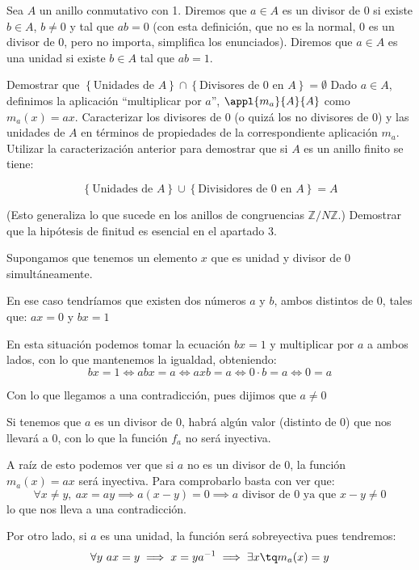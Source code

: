 \begin{problem}[10]
	Sea $A$ un anillo conmutativo con 1. Diremos que $a∈A$ es un divisor de 0 si existe $b∈A$, $b≠0$ y tal que $ab = 0$ (con esta definición, que no es la normal, 0 es un divisor de 0, pero no importa, simplifica los enunciados). Diremos que $a ∈ A$ es una unidad si existe $b ∈ A$ tal que $ab = 1$.

	\ppart Demostrar que $\left\{ \text{Unidades de } A \right\} ∩ \left\{ \text{Divisores de 0 en } A \right\} = \emptyset$
	\ppart Dado $a ∈ A$, definimos la aplicación ``multiplicar por $a$'', $\appl{m_a}{A}{A}$ como $m_a(x) = ax$. Caracterizar los divisores de 0 (o quizá los no divisores de 0) y las unidades de $A$ en términos de propiedades de la correspondiente aplicación $m_a$.
	\ppart Utilizar la caracterización anterior para demostrar que si $A$ es un anillo finito se tiene:

		\[\left\{ \text{Unidades de } A \right\} \cup \left\{ \text{Divisidores de 0 en } A \right\} = A\]

		(Esto generaliza lo que sucede en los anillos de congruencias $ℤ/Nℤ$.)
	\ppart Demostrar que la hipótesis de finitud es esencial en el apartado 3.

	\solution

	\spart
	Supongamos que tenemos un elemento $x$ que es unidad y divisor de 0 simultáneamente.

	En ese caso tendríamos que existen dos números $a$ y $b$, ambos distintos de 0, tales que: $ax = 0$ y $bx = 1$

	En esta situación podemos tomar la ecuación $bx=1$ y multiplicar por $a$ a ambos lados, con lo que mantenemos la igualdad, obteniendo:
	\[bx = 1 \iff abx = a \iff axb = a \iff 0 \cdot b = a \iff 0 = a\]

	Con lo que llegamos a una contradicción, pues dijimos que $a \neq 0$

	\spart

	Si tenemos que $a$ es un divisor de 0, habrá algún valor (distinto de 0) que nos llevará a 0, con lo que la función $f_a$ no será inyectiva.

	A raíz de esto podemos ver que si $a$ no es un divisor de 0, la función $m_a(x)=ax$ será inyectiva. Para comprobarlo basta con ver que:
	\[\forall x\neq y, \ ax=ay \implies a(x-y)=0 \implies a \text{ divisor de 0 ya que } x-y \neq 0\]
	lo que nos lleva a una contradicción.

	Por otro lado, si $a$ es una unidad, la función será sobreyectiva pues tendremos:
	\[\forall y \ ax = y \implies x = ya^{-1} \implies \exists x \tq m_a(x)=y\]


\end{problem}
